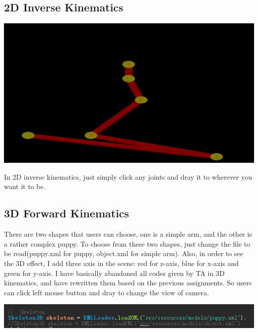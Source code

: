 \documentclass[a4paper, 11pt]{article}
\begin{document}
    \subsection{2D Inverse Kinematics}
        \begin{center}
            \includegraphics[width = \textwidth]{Capture0.PNG}
        \end{center}
        In 2D inverse kinematics, just simply click any joints and dray it to wherever you want it to be.
    \subsection{3D Forward Kinematics}
        There are two shapes that users can choose, one is a simple arm, and the other is a rather complex puppy. To choose from these two shapes, just change the file to be read(puppy.xml for puppy, object.xml for simple arm). Also, in order to see the 3D effect, I add three axis in the scene: red for z-axis, blue for x-axis and green for y-axis. I have basically abandoned all codes given by TA in 3D kinematics, and have rewritten them based on the previous assignments. So users can click left mouse button and dray to change the view of camera.
        \begin{center}
            \includegraphics[width = \textwidth]{Capture2.PNG}
        \end{center}
\end{document}
